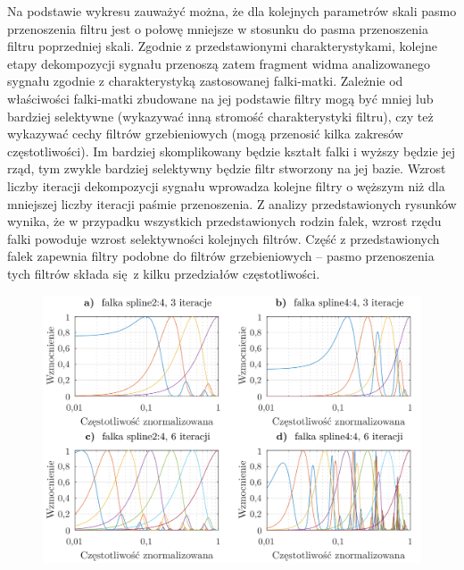 Na podstawie wykresu zauważyć można, że dla kolejnych parametrów skali pasmo przenoszenia filtru jest o połowę mniejsze w stosunku do pasma przenoszenia filtru poprzedniej skali. Zgodnie z przedstawionymi charakterystykami, kolejne etapy dekompozycji sygnału przenoszą zatem fragment widma analizowanego sygnału zgodnie z charakterystyką zastosowanej falki-matki. Zależnie od właściwości falki-matki zbudowane na jej podstawie filtry mogą być mniej lub bardziej selektywne (wykazywać inną stromość charakterystyki filtru), czy też wykazywać cechy filtrów grzebieniowych (mogą przenosić kilka zakresów częstotliwości). Im bardziej skomplikowany będzie kształt falki i wyższy będzie jej rząd, tym zwykle bardziej selektywny będzie filtr stworzony na jej bazie. Wzrost liczby iteracji dekompozycji sygnału wprowadza kolejne filtry o węższym niż dla mniejszej liczby iteracji paśmie przenoszenia. Z analizy przedstawionych rysunków wynika, że w przypadku wszystkich przedstawionych rodzin falek, wzrost rzędu falki powoduje wzrost selektywności kolejnych filtrów. Część z przedstawionych falek zapewnia filtry podobne do filtrów grzebieniowych -- pasmo przenoszenia tych filtrów składa się z kilku przedziałów częstotliwości.

\begin{figure}[htb!]
\begin{center}
\includegraphics{obrazki/bank_spline_demo}
\end{center}
\end{figure}

